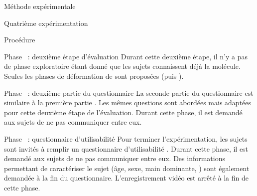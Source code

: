 \documentclass[myfrancais,ngerman,english,french]{mythesis}
\begin{document}
\begin{mychapter}{Méthode expérimentale}
\begin{mysection}{Quatrième expérimentation}
\begin{mysubsection}{Procédure}
\begin{myparagraph}{Phase~ : deuxième étape d'évaluation}
					Durant cette deuxième étape, il n'y a pas de phase exploratoire étant donné que les sujets connaissent déjà la molécule.
					Seules les phases de déformation de  sont proposées (\myUbiquitin puis \myNusENusG).
				\end{myparagraph}
				\begin{myparagraph}{Phase~ : deuxième partie du questionnaire}
					La seconde partie du questionnaire est similaire à la première partie .
					Les mêmes questions sont abordées mais adaptées pour cette deuxième étape de l'évaluation.
					Durant cette phase, il est demandé aux sujets de ne pas communiquer entre eux.
				\end{myparagraph}
				\begin{myparagraph}{Phase~ : questionnaire d'utilisabilité}
					Pour terminer l'expérimentation, les sujets sont invités à remplir un questionnaire d'utilisabilité .
					Durant cette phase, il est demandé aux sujets de ne pas communiquer entre eux.
					Des informations permettant de caractériser le sujet (âge, sexe, main dominante, \myetc) sont également demandée à la fin du questionnaire.
					L'enregistrement vidéo est arrêté à la fin de cette phase.
				\end{myparagraph}
			\end{mysubsection}
		\end{mysection}
	\end{mychapter}
\end{document}
